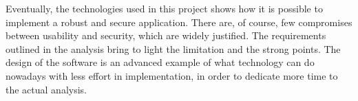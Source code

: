 Eventually, the technologies used in this project shows how it is possible to implement a robust and secure application. There are, of course, few compromises between usability and security, which are widely justified. The requirements outlined in the analysis bring to light the limitation and the strong points. The design of the software is an advanced example of what technology can do nowadays with less effort in implementation, in order to dedicate more time to the actual analysis.